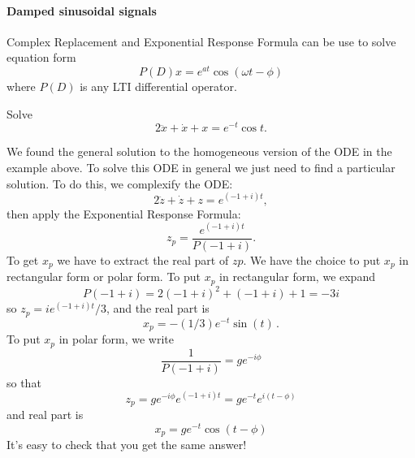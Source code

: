 \paragraph{Damped sinusoidal signals}
Complex Replacement and Exponential Response Formula can be use to solve equation form
\begin{equation*}
  P\left(D\right)x=e^{at}\cos (\omega t-\phi )
\end{equation*}
where $P(D)$ is any LTI differential operator.

\begin{example}
  Solve
  \begin{equation*}
    2\ddot x+\dot x+x=e^{-t}\cos t.
  \end{equation*}
\end{example}

We found the general solution to the homogeneous version of the ODE in the example above.
To solve this ODE in general we just need to find a particular solution.
To do this, we complexify the ODE:
\begin{equation*}
  2\ddot{z}+\dot{z}+z=e^{(-1+i)t},
\end{equation*}
then apply the Exponential Response Formula:
\begin{equation*}
  z_ p=\frac{e^{(-1+i)t}}{P(-1+i)}.
\end{equation*}
To get $x_p$ we have to extract the real part of $zp$.
We have the choice to put $x_p$ in rectangular form or polar form.
To put $x_p$ in rectangular form, we expand
\begin{equation*}
  P(-1+i)=2(-1+i)^2+(-1+i)+1=-3i
\end{equation*}
so $z_p = i e^{(-1 + i)t}/3$, and the real part is
\begin{equation*}
  x_ p=-(1/3)e^{-t}\sin (t)\, .
\end{equation*}
To put $x_p$ in polar form, we write
\begin{equation*}
  \frac{1}{P(-1+i)}=ge^{-i\phi }
\end{equation*}
so that
\begin{equation*}
  z_ p=ge^{-i\phi }e^{(-1+i)t}=ge^{-t}e^{i(t-\phi )}
\end{equation*}
and real part is
\begin{equation*}
  x_ p=ge^{-t}\cos (t-\phi )
\end{equation*}
It's easy to check that you get the same answer!

